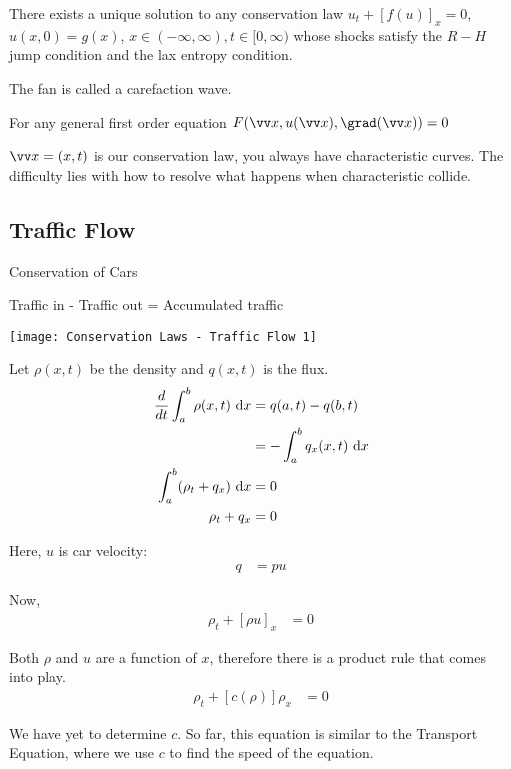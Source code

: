   \thm There exists a unique solution to any conservation law $u_t + [f(u)]_x = 0$, $u(x, 0) = g(x)$, $x \in (-\infty, \infty), t \in [0, \infty)$ whose shocks satisfy the $R-H$ jump condition and the lax entropy condition.

  \note The fan is called a carefaction wave.

  For any general first order equation $F(\vv x, u(\vv x), \grad(\vv x)) = 0$

  $\vv x = (x, t)$ is our conservation law, you always have characteristic curves. The difficulty lies with how to resolve what happens when characteristic collide.

  \subsection{Traffic Flow}
  Conservation of Cars

  Traffic in - Traffic out = Accumulated traffic

  \begin{center}
    \texttt{[image: Conservation Laws - Traffic Flow 1]}
  \end{center}

  Let $\rho(x, t)$ be the density and $q(x, t)$ is the flux.
  \begin{align}
    \frac{d}{dt} \int^b_a \rho(x, t)\ \text dx
    & = q(a, t) - q(b, t)\\
    & = -\int^b_a q_x (x, t)\ \text dx\\
    \int^b_a (\rho_t + q_x)\ \text dx & = 0\\
    \rho_t + q_x & = 0
  \end{align}

  Here, $u$ is car velocity:
  \begin{align}
    q & = pu
  \end{align}

  Now,
  \begin{align}
    \rho_t + [\rho u]_x & = 0
  \end{align}

  Both $\rho$ and $u$ are a function of $x$, therefore there is a
  product rule that comes into play.
  \begin{align}
    \rho_t + [c(\rho)]\rho_x & = 0
  \end{align}

  We have yet to determine $c$. So far, this equation is similar to the Transport
  Equation, where we use $c$ to find the speed of the equation.

